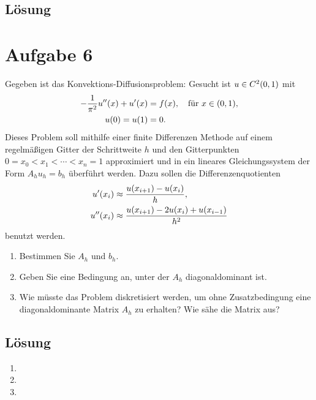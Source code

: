 \documentclass{exercise}
\begin{document}
    \subsection*{Lösung}


    \section*{Aufgabe 6}

    \begin{problem}
        Gegeben ist das Konvektions-Diffusionsproblem: Gesucht ist \(u \in C^2\parentheses*{0, 1}\) mit
        \begin{align*}
            -\frac{1}{\pi^2}u''\parentheses*{x} + u'\parentheses*{x} &= f\parentheses*{x}, \quad \text{für }x \in \parentheses*{0, 1},\\
            u\parentheses*{0} = u\parentheses*{1} &= 0.
        \end{align*}
        Dieses Problem soll mithilfe einer finite Differenzen Methode auf einem regelmäßigen Gitter der Schrittweite \(h\) und den Gitterpunkten \(0 = x_0 < x_1 < \cdots < x_n = 1\) approximiert und in ein lineares Gleichungssystem der Form \(A_h u_h = b_h\) überführt werden.
        Dazu sollen die Differenzenquotienten
        \begin{align*}
            u'\parentheses*{x_i} &\approx \frac{u\parentheses*{x_{i + 1}} - u\parentheses*{x_i}}{h},\\
            u''\parentheses*{x_i} &\approx \frac{u\parentheses*{x_{i + 1}} - 2u\parentheses*{x_i} + u\parentheses*{x_{i - 1}}}{h^2}
        \end{align*}
        benutzt werden.
        \begin{enumerate}
            \item Bestimmen Sie \(A_h\) und \(b_h\).
            \item Geben Sie eine Bedingung an, unter der \(A_h\) diagonaldominant ist.
            \item Wie müsste das Problem diskretisiert werden, um ohne Zusatzbedingung eine diagonaldominante Matrix \(A_h\) zu erhalten?
            Wie sähe die Matrix aus?
        \end{enumerate}
    \end{problem}

    \subsection*{Lösung}
    \begin{enumerate}
        \item
        \item
        \item
    \end{enumerate}
\end{document}
